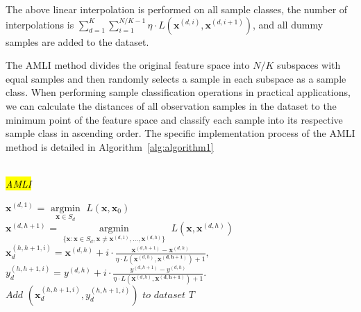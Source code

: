 \documentclass[mathematics,article,accept,pdftex,moreauthors]{Definitions/mdpi}
\begin{document}
The above linear interpolation is performed on all sample classes, the number of interpolations is $\sum_{d=1}^{K}\sum_{i=1}^{N/K-1} \eta \cdot L(\bm{x}^{(d,i)}, \bm{x}^{(d,i+1)})$, and all dummy samples are added to the dataset.

The AMLI method divides the original feature space into $N/K$ subspaces with equal samples and then randomly selects a sample in each subspace as a sample class. When performing sample classification operations in practical applications, we can calculate the distances of all observation samples in the dataset to the minimum point of the feature space and classify each sample into its respective sample class in ascending order. The specific implementation process of the AMLI method is detailed in Algorithm~\ref{alg:algorithm1}
\\\\
\vspace{-6pt}


\begin{algorithm}[H]
	\SetAlgoLined %
	\label{alg:algorithm1}
	\caption{\hl{\emph{AMLI}}}%


	{$\bm{x}^{(d,1)}$ = $\mathop{argmin}\limits_{\bm{x}\in S_{d}}$ $L(\bm{x},\bm{x}_{0})$ \\
	{$\bm{x}^{(d,h+1)}$ = $\mathop{argmin}\limits_{\{\bm{x}:\bm{x}\in S_{d}, \bm{x}\neq\bm{x}^{(d,1)}, \ldots, \bm{x}^{(d,h)}\}}$ $L(\bm{x},\bm{x}^{(d,h)})$ \\
	{$\bm{x}^{(h,h+1,i)}_{d} = \bm{x}^{(d,h)} + i \cdot \displaystyle{\frac{\bm{x}^{(d,h+1)}-\bm{x}^{(d,h)}}{\eta \cdot L(\bm{x}^{(d,h)}, \bm{x^{(d,h+1)}}) + 1}},$  ${y}^{(h,h+1,i)}_{d} = {y}^{(d,h)} + i \cdot \displaystyle{\frac{{y}^{(d,h+1)}-{y}^{(d,h)}}{\eta \cdot L(\bm{x}^{(d,h)}, \bm{x^{(d,h+1)}}) + 1}}.$ \\ \hspace{0.2em} $Add$ $(\bm{x}_{d}^{(h, h+1, i)}, y_{d}^{(h, h+1, i)})$ $to$ $dataset$ $T$
	}}}	
\end{algorithm}
\end{document}
